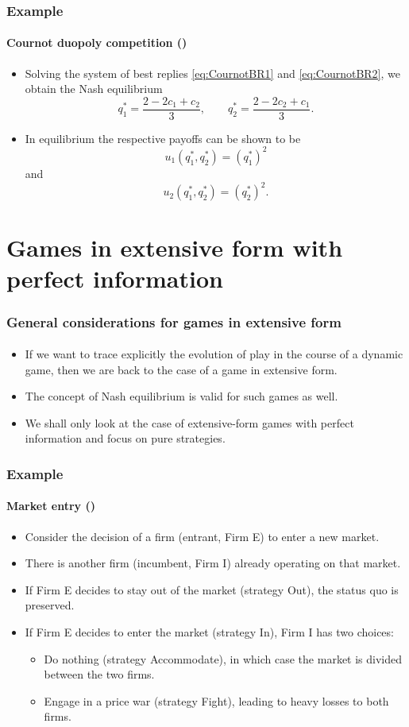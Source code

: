 \documentclass[10pt]{beamer}
\theoremstyle{definition}
\begin{document}
\begin{frame}[fragile]
\frametitle{Example }
\framesubtitle{Cournot duopoly competition ()}
\begin{itemize}\itemsep1em
\item Solving the system of best replies \eqref{eq:CournotBR1} and \eqref{eq:CournotBR2}, we obtain the Nash equilibrium \[ q^*_1 = \dfrac{2-2c_1+c_2}{3},\qquad q^*_2 = \dfrac{2-2c_2+c_1}{3}. \]
\item In equilibrium the respective payoffs can be shown to be \[ u_1(q_1^*,q_2^*) = (q_1^*)^2 \] and \[ u_2(q_1^*,q_2^*) = (q_2^*)^2 .\]
\end{itemize}
\end{frame}



\section{Games in extensive form with perfect information}

\begin{frame}[fragile]
\frametitle{General considerations for games in extensive form}
\framesubtitle{}
\begin{itemize}\itemsep1em
\item If we want to trace explicitly the evolution of play in the course of a dynamic game, then we are back to the case of a game in extensive form.
\item The concept of Nash equilibrium is valid for such games as well.
\item We shall only look at the case of extensive-form games with perfect information and focus on pure strategies.
\end{itemize}
\end{frame}

\setcounter{slidenum}{1}
\begin{frame}[fragile]
\frametitle{Example }
\framesubtitle{Market entry ()}
\begin{itemize}\itemsep1em
\item Consider the decision of a firm (entrant, Firm E) to enter a new market.
\item There is another firm (incumbent, Firm I) already operating on that market.
\item If Firm E decides to stay out of the market (strategy Out), the status quo is preserved.
\item If Firm E decides to enter the market (strategy In), Firm I has two choices:
	\begin{itemize}\itemsep1em
	\item Do nothing (strategy Accommodate), in which case the market is divided between the two firms.
	\item Engage in a price war (strategy Fight), leading to heavy losses to both firms.
	\end{itemize} 
\end{itemize}
\end{frame}
\end{document}
